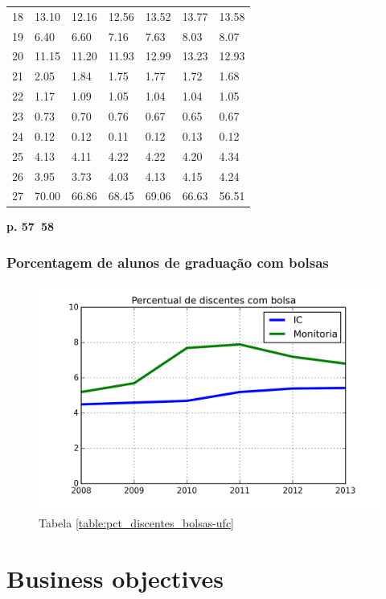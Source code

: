 \documentclass{report}
\begin{document}
\begin{tabular}{lllllll}
18        &  13.10 &  12.16 &  12.56 &  13.52 &  13.77 &  13.58 \\
19        &  6.40 &  6.60 &  7.16 &  7.63 &  8.03 &  8.07 \\
20        &  11.15 &  11.20 &  11.93 &  12.99 &  13.23 &  12.93 \\
21        &  2.05 &  1.84 &  1.75 &  1.77 &  1.72 &  1.68 \\
22        &  1.17 &  1.09 &  1.05 &  1.04 &  1.04 &  1.05 \\
23        &  0.73 &  0.70 &  0.76 &  0.67 &  0.65 &  0.67 \\
24        &  0.12 &  0.12 &  0.11 &  0.12 &  0.13 &  0.12 \\
25        &  4.13 &  4.11 &  4.22 &  4.22 &  4.20 &  4.34 \\
26        &  3.95 &  3.73 &  4.03 &  4.13 &  4.15 &  4.24 \\
27        &  70.00 &  66.86 &  68.45 &  69.06 &  66.63 &  56.51 \\
\bottomrule
\end{tabular}

\textbf{p. 57~58}

\subsection{Porcentagem de alunos de graduação com bolsas}

\begin{figure}[H]
	\includegraphics{img/pct_discentes_bolsa_ufc.png}
	\caption{Tabela \ref{table:pct_discentes_bolsas-ufc}}
	\label{img:pct_discentes_bolsas-ufc}
\end{figure}


\chapter{Business objectives}
\end{document}
